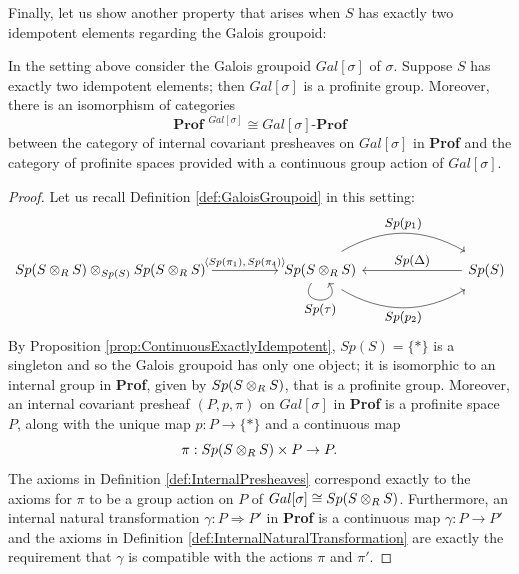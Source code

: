 Finally, let us show another property that arises when $S$ has exactly two idempotent elements regarding the Galois groupoid:
\begin{proposition}
\label{prop:GroupoidIsGroup}
    In the setting above consider the Galois groupoid $Gal[\sigma]$ of $\sigma$. Suppose $S$ has exactly two idempotent elements; then $Gal[\sigma]$ is a profinite group. Moreover, there is an isomorphism of categories
    \[ {\textbf{Prof }}^{Gal[\sigma]}\cong Gal[\sigma]\textbf{-Prof} \]
    between the category of internal covariant presheaves on $Gal[\sigma]$ in \textbf{Prof} and the category of profinite spaces provided with a continuous group action of $Gal[\sigma]$.
    \begin{proof}
        Let us recall Definition \ref{def:GaloisGroupoid} in this setting:
        \begin{equation*}
            \begin{tikzcd}[every label/.append style = {font = \small}]
                 Sp(S\tens{R}S)\tens{Sp(S)}Sp(S\tens{R}S) \arrow[rr, "\text{\scriptsize$\limitmorph{Sp(\pi_1)}{Sp(\pi_4)}$}"] & &  Sp(S\tens{R}S) \arrow[rrr, "Sp(p_2)"', bend right, shift right=2] \arrow[rrr, "Sp(p_1)", bend left, shift left=2] \arrow["Sp(\tau)"', loop, distance=2em, in=305, out=235] & & & Sp(S) \arrow[lll, "Sp(\Delta)"']
            \end{tikzcd}
        \end{equation*}
        By Proposition \ref{prop:ContinuousExactlyIdempotent}, $Sp(S)=\{*\}$ is a singleton and so the Galois groupoid has only one object; it is isomorphic to an internal group in \textbf{Prof}, given by $Sp(S\otimes_{R}S)$, that is a profinite group. Moreover, an internal covariant presheaf $(P,p,\pi)$ on $Gal[\sigma]$ in \textbf{Prof} is a profinite space $P$, along with the unique map $p:P\to \{*\}$ and a continuous map
        \[ \pi: Sp(S\otimes_{R}S)\times P\to P. \]
        The axioms in Definition \ref{def:InternalPresheaves} correspond exactly to the axioms for $\pi$ to be a group action on $P$ of $Gal[\sigma]\cong Sp(S\otimes_{R}S)$. Furthermore, an internal natural transformation $\gamma:P\Rightarrow P'$ in \textbf{Prof} is a continuous map $\gamma:P\to P'$ and the axioms in Definition \ref{def:InternalNaturalTransformation} are exactly the requirement that $\gamma$ is compatible with the actions $\pi$ and $\pi'$.
    \end{proof}
\end{proposition}


